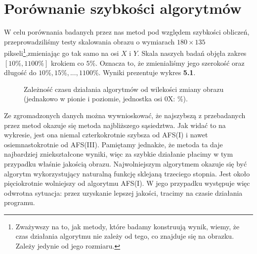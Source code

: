 \section{Porównanie szybkości algorytmów}
W celu porównania badanych przez nas metod pod względem szybkości obliczeń,
przeprowadziliśmy testy skalowania obrazu o wymiarach $180\times135$ pikseli\footnote{Zważywszy na to, jak metody, które badamy konstruują wynik, wiemy, że czas działania algorytmu nie zależy od tego, co znajduje się na obrazku. Zależy jedynie od jego rozmiaru.},zmieniając go tak samo na osi $X$ i $Y$. Skala naszych badań objęła zakres
$[10\%, 1100\%]$ krokiem co $5\%$. Oznacza to, że zmienialiśmy jego szerokość
oraz długość do $10\%, 15\%, ... ,1100\%$. Wyniki prezentuje wykres \textbf{5.1}.
\begin{figure}[h!tb]
\begin{center}

\caption{Zależność czasu działania algorytmów od wilekości zmiany obrazu (jednakowo w pionie i poziomie, jednostka osi 0X: $\%$).}
\end{center}
\end{figure}

Ze zgromadzonych danych można wywnioskować, że najszybszą z przebadanych przez
metod okazuje się metoda najbliższego sąsiedztwa. Jak widać to na wykresie, jest
ona niemal czterkokrotnie szybsza od AFS(I) i nawet osiemnastokrotnie od AFS(III).
Pamiętamy jednakże, że metoda ta daje najbardziej zniekształcone wyniki, więc
za szybkie działanie płacimy w tym przypadku właśnie jakością obrazu.
Najwolniejszym algorytmem okazuje się być algorytm wykorzystujący naturalną
funkcję sklejaną trzeciego stopnia. Jest około pięciokrotnie wolniejszy od algorytmu AFS(I).
W jego przypadku występuje więc odwrotna sytuacja: przez uzyskanie lepszej jakości,
tracimy na czasie działania programu.


